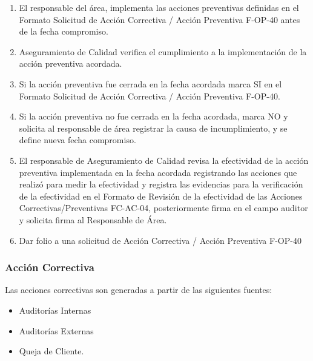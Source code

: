 \begin{enumerate}
	\item El responsable del área, implementa las acciones preventivas definidas en el Formato Solicitud de Acción Correctiva / Acción Preventiva F-OP-40 antes de la fecha compromiso.
	\item Aseguramiento de Calidad verifica el cumplimiento a la implementación de la acción preventiva acordada.
	\item Si la acción preventiva fue cerrada en la fecha acordada marca SI en el Formato Solicitud de Acción Correctiva / Acción Preventiva F-OP-40.
	\item Si la acción preventiva no fue cerrada en la fecha acordada, marca NO y solicita al responsable de área registrar la causa de incumplimiento, y se define nueva fecha compromiso.
	\item El responsable de Aseguramiento de Calidad revisa la efectividad de la acción preventiva implementada en la fecha acordada registrando las acciones que realizó para medir la efectividad y registra las evidencias para la verificación de la efectividad en el Formato de Revisión de la efectividad de las Acciones Correctivas/Preventivas FC-AC-04, posteriormente firma en el campo auditor y solicita firma al Responsable de Área.
	\item Dar folio a una solicitud de Acción Correctiva / Acción Preventiva F-OP-40
\end{enumerate}

\subsubsection{Acción Correctiva}

Las acciones correctivas son generadas a partir de las siguientes fuentes:

\begin{itemize}
	\item Auditorías Internas
	\item Auditorías Externas
	\item Queja de Cliente.
\end{itemize}


